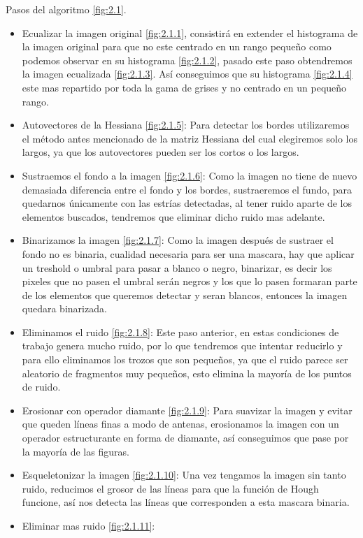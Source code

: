Pasos del algoritmo \ref{fig:2.1}.
\begin{itemize}
	\item Ecualizar la imagen original \ref{fig:2.1.1}, consistirá en extender el histograma de la imagen original para que no este centrado en un rango pequeño como podemos observar en su histograma \ref{fig:2.1.2}, pasado este paso obtendremos la imagen ecualizada \ref{fig:2.1.3}.
Así conseguimos que su histograma \ref{fig:2.1.4} este mas repartido por toda la gama de grises y no centrado en un pequeño rango.
	\item Autovectores de la Hessiana \ref{fig:2.1.5}:
Para detectar los bordes utilizaremos el método antes mencionado de la matriz Hessiana del cual elegiremos solo los largos, ya que los autovectores pueden ser los cortos o los largos. 
	\item Sustraemos el fondo a la imagen \ref{fig:2.1.6}:
Como la imagen no tiene de nuevo demasiada diferencia entre el fondo y los bordes, sustraeremos el fundo, para quedarnos únicamente con las estrías detectadas, al tener ruido aparte de los elementos buscados, tendremos que eliminar dicho ruido mas adelante.
	\item Binarizamos la imagen \ref{fig:2.1.7}:
Como la imagen después de sustraer el fondo no es binaria, cualidad necesaria para ser una mascara, hay que aplicar un treshold o umbral para pasar a blanco o negro, binarizar, es decir los pixeles que no pasen el umbral serán negros y los que lo pasen formaran parte de los elementos que queremos detectar y seran blancos, entonces la imagen quedara binarizada.
	\item Eliminamos el ruido \ref{fig:2.1.8}:
Este paso anterior, en estas condiciones de trabajo genera mucho ruido, por lo que tendremos que intentar reducirlo y para ello eliminamos los trozos que son pequeños, ya que el ruido parece ser aleatorio de fragmentos muy pequeños, esto elimina la mayoría de los puntos de ruido.
	\item Erosionar con operador diamante \ref{fig:2.1.9}:
Para suavizar la imagen y evitar que queden líneas finas a modo de antenas, erosionamos la imagen con un operador estructurante en forma de diamante, así conseguimos que pase por la mayoría de las figuras.
	\item Esqueletonizar la imagen \ref{fig:2.1.10}:
Una vez tengamos la imagen sin tanto ruido, reducimos el grosor de las líneas para que la función de Hough funcione, así nos detecta las líneas que corresponden a esta mascara binaria.
	\item Eliminar mas ruido \ref{fig:2.1.11}:

\end{itemize}
